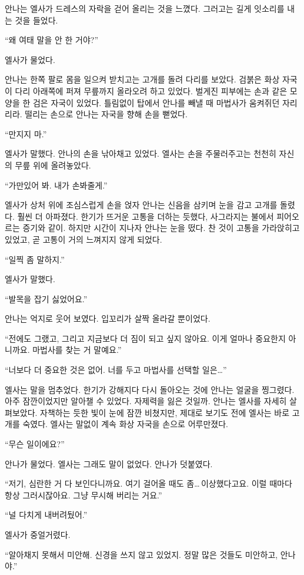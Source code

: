 안나는 엘사가 드레스의 자락을 걷어 올리는 것을 느꼈다. 그러고는 길게 잇소리를 내는 것을 들었다.

``왜 여태 말을 안 한 거야?''

엘사가 물었다.

안나는 한쪽 팔로 몸을 일으켜 받치고는 고개를 돌려 다리를 보았다. 검붉은 화상 자국이 다리 아래쪽에 퍼져 무릎까지 올라오려 하고 있었다. 벌게진 피부에는 손과 같은 모양을 한 검은 자국이 있었다. 틀림없이 탑에서 안나를 빼낼 때 마법사가 움켜쥐던 자리리라. 떨리는 손으로 안나는 자국을 향해 손을 뻗었다.

``만지지 마.''

엘사가 말했다. 안나의 손을 낚아채고 있었다. 엘사는 손을 주물러주고는 천천히 자신의 무릎 위에 올려놓았다.

``가만있어 봐. 내가 손봐줄게.''

엘사가 상처 위에 조심스럽게 손을 얹자 안나는 신음을 삼키며 눈을 감고 고개를 돌렸다. 훨씬 더 아파졌다. 한기가 뜨거운 고통을 더하는 듯했다, 사그라지는 불에서 피어오르는 증기와 같이. 하지만 시간이 지나자 안나는 눈을 떴다. 찬 것이 고통을 가라앉히고 있었고, 곧 고통이 거의 느껴지지 않게 되었다.

``일찍 좀 말하지.''

엘사가 말했다.

``발목을 잡기 싫었어요.''

안나는 억지로 웃어 보였다. 입꼬리가 살짝 올라갈 뿐이었다.

``전에도 그랬고, 그리고 지금보다 더 짐이 되고 싶지 않아요. 이게 얼마나 중요한지 아니까요. 마법사를 찾는 거 말예요.''

``너보다 더 중요한 것은 없어. 너를 두고 마법사를 선택할 일은\ldots''

엘사는 말을 멈추었다. 한기가 강해지다 다시 돌아오는 것에 안나는 얼굴을 찡그렸다. 아주 잠깐이었지만 알아챌 수 있었다. 자제력을 잃은 것일까. 안나는 엘사를 자세히 살펴보았다. 자책하는 듯한 빛이 눈에 잠깐 비쳤지만, 제대로 보기도 전에 엘사는 바로 고개를 숙였다. 엘사는 말없이 계속 화상 자국을 손으로 어루만졌다.

``무슨 일이에요?''

안나가 물었다. 엘사는 그래도 말이 없었다. 안나가 덧붙였다.

``저기, 심란한 거 다 보인다니까요. 여기 걸어올 때도 좀\ldots\,이상했다고요. 이럴 때마다 항상 그러시잖아요. 그냥 무시해 버리는 거요.''

``널 다치게 내버려뒀어.''

엘사가 중얼거렸다.

``알아채지 못해서 미안해. 신경을 쓰지 않고 있었지. 정말 많은 것들도 미안하고, 안나야.''

